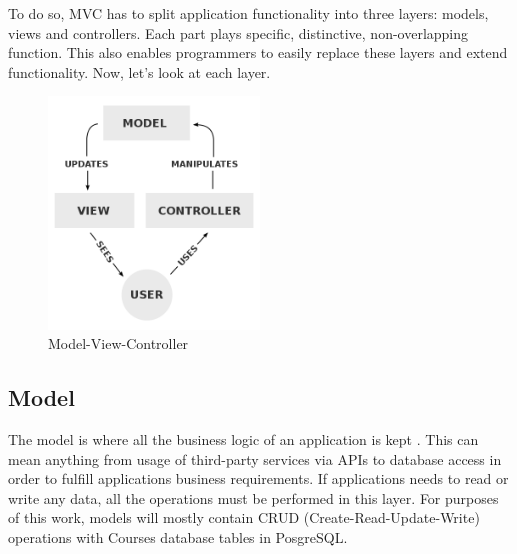 

To do so, MVC has to split application functionality into three layers: models, views and controllers. Each part plays specific, distinctive, non-overlapping function. This also enables programmers to easily replace these layers and extend functionality. Now, let's look at each layer.


\begin{figure}[t]
    \centering
    \includegraphics[width=0.5\textwidth]{images/mvc.png}
    \caption{Model-View-Controller}
    \label{fig:mvc}
\end{figure}

\subsection{Model}

The model is where all the business logic of an application is kept \cite{phpmvc}. This can mean anything from usage of third-party services via APIs to database access in order to fulfill applications business requirements. If applications needs to read or write any data, all the operations must be performed in this layer. For purposes of this work, models will mostly contain CRUD (Create-Read-Update-Write) operations with Courses database tables in PosgreSQL.


